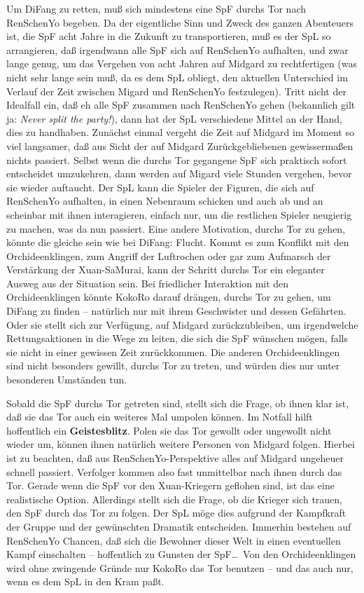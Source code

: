 \documentclass[
a4paper,
twoside,
DIV=calc,
BCOR=4mm,
fontsize=9pt,
twocolumn=on,
titlepage=on,
parskip=half
]{scrartcl}
\begin{document}
Um DiFang zu retten, muß sich mindestens eine SpF durchs Tor nach
RenSchenYo begeben. Da der eigentliche Sinn und Zweck des ganzen
Abenteuers ist, die SpF acht Jahre in die Zukunft zu transportieren,
muß es der SpL so arrangieren, daß irgendwann alle SpF sich auf
RenSchenYo aufhalten, und zwar lange genug, um das Vergehen von acht
Jahren auf Midgard zu rechtfertigen (was nicht sehr lange sein muß, da
es dem SpL obliegt, den aktuellen Unterschied im Verlauf der Zeit
zwischen Migard und RenSchenYo festzulegen). Tritt nicht der Idealfall
ein, daß eh alle SpF zusammen nach RenSchenYo gehen (bekannlich gilt
ja: \emph{Never split the party!}), dann hat der SpL verschiedene
Mittel an der Hand, dies zu handhaben. Zunächst einmal vergeht die
Zeit auf Midgard im Moment so viel langsamer, daß aus Sicht der auf
Midgard Zurückgebliebenen gewissermaßen nichts passiert. Selbst wenn
die durchs Tor gegangene SpF sich praktisch sofort entscheidet
umzukehren, dann werden auf Migard viele Stunden vergehen, bevor sie
wieder auftaucht. Der SpL kann die Spieler der Figuren, die sich auf
RenSchenYo aufhalten, in einen Nebenraum schicken und auch ab und an
scheinbar mit ihnen interagieren, einfach nur, um die restlichen
Spieler neugierig zu machen, was da nun passiert. Eine andere
Motivation, durchs Tor zu gehen, könnte die gleiche sein wie bei
DiFang: Flucht. Kommt es zum Konflikt mit den Orchideenklingen, zum
Angriff der Luftrochen oder gar zum Aufmarsch der Verstärkung der
Xuan-SaMurai, kann der Schritt durchs Tor ein eleganter Ausweg aus der
Situation sein. Bei friedlicher Interaktion mit den Orchideenklingen
könnte KokoRo darauf drängen, durchs Tor zu gehen, um DiFang zu finden
-- natürlich nur mit ihrem Geschwister und dessen Gefährten. Oder sie
stellt sich zur Verfügung, auf Midgard zurückzubleiben, um
irgendwelche Rettungsaktionen in die Wege zu leiten, die sich die SpF
wünschen mögen, falls sie nicht in einer gewissen Zeit
zurückkommen. Die anderen Orchideenklingen sind nicht besonders
gewillt, durchs Tor zu treten, und würden dies nur unter besonderen
Umständen tun.

Sobald die SpF durchs Tor getreten sind, stellt sich die Frage, ob
ihnen klar ist, daß sie das Tor auch ein weiteres Mal umpolen
können. Im Notfall hilft hoffentlich ein \textbf{Geistesblitz}. Polen
sie das Tor gewollt oder ungewollt nicht wieder um, können ihnen
natürlich weitere Personen von Midgard folgen. Hierbei ist zu
beachten, daß aus RenSchenYo-Perspektive alles auf Midgard ungeheuer
schnell passiert. Verfolger kommen also fast unmittelbar nach ihnen
durch das Tor. Gerade wenn die SpF vor den Xuan-Kriegern geflohen
sind, ist das eine realistische Option. Allerdings stellt sich die
Frage, ob die Krieger sich trauen, den SpF durch das Tor zu
folgen. Der SpL möge dies aufgrund der Kampfkraft der Gruppe und der
gewünschten Dramatik entscheiden. Immerhin bestehen auf RenSchenYo
Chancen, daß sich die Bewohner dieser Welt in einen eventuellen Kampf
einschalten -- hoffentlich zu Gunsten der SpF\dots\ Von den
Orchideenklingen wird ohne zwingende Gründe nur KokoRo das Tor
benutzen -- und das auch nur, wenn es dem SpL in den Kram paßt.
\end{document}
